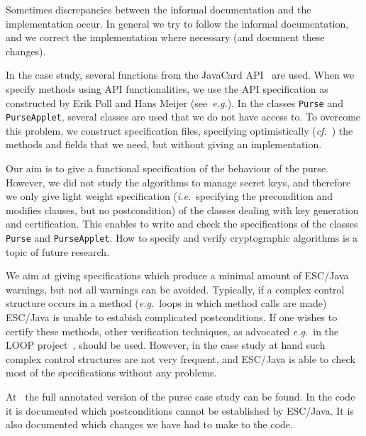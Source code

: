 \documentclass[a4paper]{llncs}
\begin{document}
Sometimes discrepancies between the informal documentation and the
implementation occur. In general we try to follow the informal
documentation, and we correct the implementation where necessary
(and document these changes). 

In the case study, several functions from the JavaCard
API~\cite{JavaCardAPI} are used. When we specify methods using API
functionalities, we use the API specification as constructed by Erik
Poll and Hans Meijer (see~\emph{e.g.}\cite{MeijerP01}).  In the
classes \texttt{Purse} and \texttt{PurseApplet}, several classes are
used that we do not have access to. To overcome this problem, we
construct specification files, specifying optimistically
(\emph{cf.}~\cite{FlanaganL01}) the methods and fields that we need,
but without giving an implementation.

Our aim is to give a functional specification of the behaviour of the
purse. However, we did not study the algorithms to manage secret keys,
and therefore we only give light weight specification
(\emph{i.e.}~specifying the precondition and modifies clauses, but no
postcondition) of the classes dealing with key generation and
certification. This enables to write and check the specifications of
the classes \texttt{Purse} and \texttt{PurseApplet}. How to specify
and verify cryptographic algorithms is a topic of future research.

We aim at giving specifications which produce a minimal amount of
ESC/Java warnings, but not all warnings can be avoided. Typically, if
a complex control structure occurs in a method (\emph{e.g.}~loops in
which method calls are made) ESC/Java is unable to estabish
complicated postconditions. If one wishes to certify these methods,
other verification techniques, as advocated \emph{e.g.}~in the LOOP
project~\cite{LOOPUrl}, should be used. However, in the case study at
hand such complex control structures are not very frequent, and
ESC/Java is able to check most of the specifications without any
problems.

At~\cite{CatanoH01Url} the full annotated version of the purse case
study can be found. In the code it is documented which postconditions
cannot be established by ESC/Java. It is also documented which changes 
we have had to make to the code.
\end{document}
